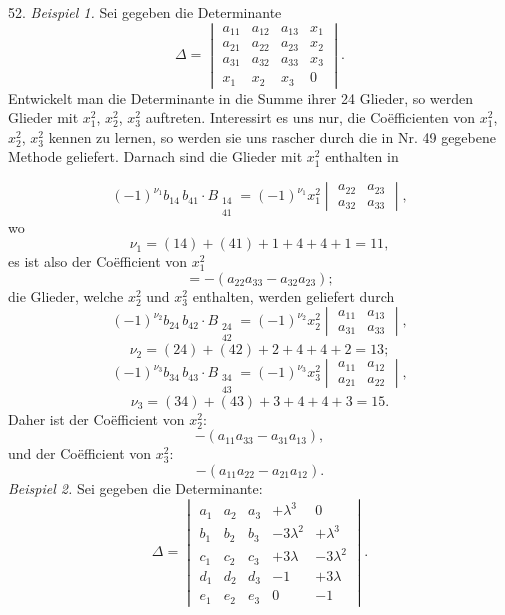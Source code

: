 \documentclass[11pt]{article}
\providecommand{\weberpage}[1]{}
\let\Delta\varDelta
\begin{document}
52. \textit{Beispiel 1.} Sei gegeben die Determinante
\[
\Delta = \begin{vmatrix} a_{11} & a_{12} & a_{13} & x_1 \\ a_{21} & a_{22} & a_{23} & x_2 \\ a_{31} & a_{32} & a_{33} & x_3 \\ x_1 & x_2 & x_3 & 0 \end{vmatrix}.
\]
Entwickelt man die Determinante in die Summe ihrer 24 Glieder, so werden Glieder mit $x_1^2$, $x_2^2$, $x_3^2$ auftreten. Interessirt es uns nur, die Co\"efficienten von $x_1^2$, $x_2^2$, $x_3^2$ kennen zu lernen, so werden sie uns rascher durch die in Nr. 49 gegebene Methode geliefert. Darnach sind die Glieder mit $x_1^2$ enthalten in


\weberpage{58}
\[
(-1)^{\nu_1} b_{14}\, b_{41} \cdot B_{\substack{14 \\ 41}} = (-1)^{\nu_1} x_1^2 \begin{vmatrix} a_{22} & a_{23} \\ a_{32} & a_{33} \end{vmatrix},
\]
wo
\[
\nu_1 = (14) + (41) + 1 + 4 + 4 + 1 = 11,
\]
es ist also der Co\"efficient von $x_1^2$
\[
= - (a_{22} a_{33} - a_{32} a_{23});
\]
die Glieder, welche $x_2^2$ und $x_3^2$ enthalten, werden geliefert durch
\[
(-1)^{\nu_2} b_{24}\, b_{42} \cdot B_{\substack{24 \\ 42}} = (-1)^{\nu_2} x_2^2 \begin{vmatrix} a_{11} & a_{13} \\ a_{31} & a_{33} \end{vmatrix},
\]
\[
\nu_2 = (24) + (42) + 2 + 4 + 4 + 2 = 13;
\]
\[
(-1)^{\nu_3} b_{34}\, b_{43} \cdot B_{\substack{34 \\ 43}} = (-1)^{\nu_3} x_3^2 \begin{vmatrix} a_{11} & a_{12} \\ a_{21} & a_{22} \end{vmatrix},
\]
\[
\nu_3 = (34) + (43) + 3 + 4 + 4 + 3 = 15.
\]
Daher ist der Co\"efficient von $x_2^2$:
\[
- (a_{11} a_{33} - a_{31} a_{13}),
\]
und der Co\"efficient von $x_3^2$:
\[
- (a_{11} a_{22} - a_{21} a_{12}).
\]
\textit{Beispiel 2.} Sei gegeben die Determinante:
\[
\Delta = \begin{vmatrix}
a_1 & a_2 & a_3 & +\lambda^3 & 0 \\
b_1 & b_2 & b_3 & -3\lambda^2 & +\lambda^3 \\
c_1 & c_2 & c_3 & +3\lambda & -3\lambda^2 \\
d_1 & d_2 & d_3 & -1 & +3\lambda \\
e_1 & e_2 & e_3 & 0 & -1
\end{vmatrix}.
\]
\end{document}
